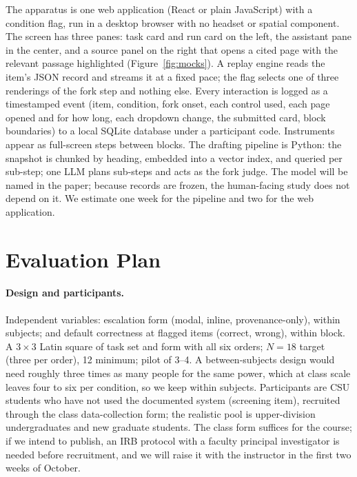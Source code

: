 \documentclass[sigconf,nonacm]{acmart}
\begin{document}
The apparatus is one web application (React or plain JavaScript) with a
condition flag, run in a desktop browser with no headset or spatial
component. The screen has three panes: task card and run card on the
left, the assistant pane in the center, and a source panel on the right
that opens a cited page with the relevant passage highlighted
(Figure~\ref{fig:mocks}). A replay engine reads the item's JSON record and
streams it at a fixed pace; the flag selects one of three renderings of
the fork step and nothing else. Every interaction is logged as a
timestamped event (item, condition, fork onset, each control used, each
page opened and for how long, each dropdown change, the submitted card,
block boundaries) to a local SQLite database under a participant code.
Instruments appear as full-screen steps between blocks. The drafting
pipeline is Python: the snapshot is chunked by heading, embedded into a
vector index, and queried per sub-step; one LLM plans sub-steps and acts
as the fork judge. The model will be named in the paper; because records
are frozen, the human-facing study does not depend on it. We estimate one
week for the pipeline and two for the web application.

\section{Evaluation Plan}
\label{sec:eval}

\paragraph{Design and participants.}
Independent variables: escalation form (modal, inline, provenance-only),
within subjects; and default correctness at flagged items (correct,
wrong), within block. A $3\times3$ Latin square of task set and form with
all six orders; $N{=}18$ target (three per order), 12 minimum; pilot of
3--4. A between-subjects design would need roughly three times as many
people for the same power, which at class scale leaves four to six per
condition, so we keep within subjects. Participants are CSU students who
have not used the documented system (screening item), recruited through
the class data-collection form; the realistic pool is upper-division
undergraduates and new graduate students. The class form suffices for the
course; if we intend to publish, an IRB protocol with a faculty principal
investigator is needed before recruitment, and we will raise it with the
instructor in the first two weeks of October.
\end{document}
